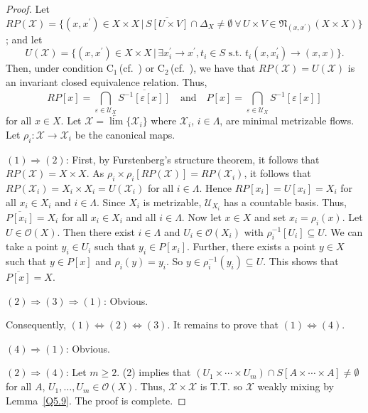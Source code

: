 \documentclass[12pt,final,3p,times]{elsarticle}
\theoremstyle{definition}
\numberwithin{equation}{section}
\begin{document}
\begin{proof}
Let
$R\!P(\mathscr{X})=\{(x,x^\prime)\in X\times X\,|\,\overline{S[U\times V]}\cap\Delta_X\not=\emptyset\ \forall\, U\times V\in\mathfrak{N}_{(x,x^\prime)}(X\times X)\}$; and let
$$
U(\mathscr{X})=\{(x,x^\prime)\in X\times X\,|\,\exists x_i^\prime\to x^\prime, t_i\in S\textrm{ s.t. }t_i(x,x_i^\prime)\to(x,x)\}.
$$
Then, under condition $\mathrm{C}_1$\,(cf.~\cite[Thm.~2.7.6]{V77}) or $\mathrm{C}_2$\,(cf.~\cite{Mc78}), we have that $R\!P(\mathscr{X})=U(\mathscr{X})$ is an invariant closed equivalence relation. Thus,
$$
R\!P[x]={\bigcap}_{\varepsilon\in\mathscr{U}_X}\overline{S^{-1}[\varepsilon[x]]}\quad \textrm{and}\quad P[x]={\bigcap}_{\varepsilon\in\mathscr{U}_X}S^{-1}[\varepsilon[x]]
$$
for all $x\in X$. Let $\mathscr{X}=\underleftarrow{\lim}\{\mathscr{X}_i\}$ where $\mathscr{X}_i$, $i\in\Lambda$, are minimal metrizable flows. Let $\rho_i\colon\mathscr{X}\rightarrow\mathscr{X}_i$ be the canonical maps.

$(1)\Rightarrow(2)$: First, by Furstenberg's structure theorem, it follows that $R\!P(\mathscr{X})=X\times X$. As $\rho_i\times\rho_i[R\!P(\mathscr{X})]=R\!P(\mathscr{X}_i)$, it follows that $R\!P(\mathscr{X}_i)=X_i\times X_i=U(\mathscr{X}_i)$ for all $i\in\Lambda$. Hence $R\!P[x_i]=U[x_i]=X_i$ for all $x_i\in X_i$ and $i\in\Lambda$. Since $X_i$ is metrizable, $\mathscr{U}_{X_i}$ has a countable basis. Thus, $\overline{P[x_i]}=X_i$ for all $x_i\in X_i$ and all $i\in\Lambda$. Now let $x\in X$ and set $x_i=\rho_i(x)$. Let $U\in \mathscr{O}(X)$. Then there exist $i\in\Lambda$ and $U_i\in\mathscr{O}(X_i)$ with $\rho_i^{-1}[U_i]\subseteq U$. We can take a point $y_i\in U_i$ such that $y_i\in P[x_i]$. Further, there exists a point $y\in X$ such that $y\in P[x]$ and $\rho_i(y)=y_i$. So $y\in\rho_i^{-1}(y_i)\subseteq U$. This shows that $\overline{P[x]}=X$.

$(2)\Rightarrow(3)\Rightarrow(1)$: Obvious.

\item Consequently, $(1)\Leftrightarrow(2)\Leftrightarrow(3)$. It remains to prove that $(1)\Leftrightarrow(4)$.

$(4)\Rightarrow(1)$: Obvious.

$(2)\Rightarrow(4)$: Let $m\ge2$. (2) implies that $(U_1\times\dotsm\times U_m)\cap S[A\times\dotsm\times A]\not=\emptyset$ for all $A$, $U_1, \dotsc, U_m\in \mathscr{O}(X)$. Thus, $\mathscr{X}\times\mathscr{X}$ is T.T. so $\mathscr{X}$ weakly mixing by Lemma~\ref{Q5.9}. The proof is complete.
\end{proof}
\end{document}
